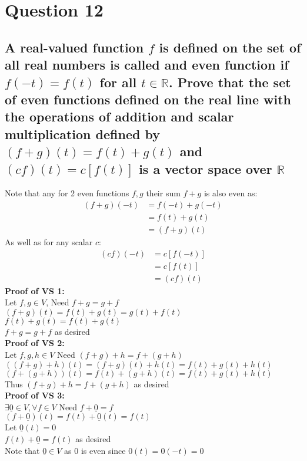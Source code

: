 \documentclass{article}
\begin{document}
\section*{Question 12}
\subsection*{A real-valued function $f$ is defined on the set of all real numbers is called and even function if $f(-t) = f(t)$ for all $t \in \mathds{R}$. Prove that the set of even functions defined on the real line with the operations of addition and scalar multiplication defined by $(f+g)(t) = f(t) + g(t)$ and $(cf)(t) = c[f(t)]$ is a vector space over $\mathds{R}$}
Note that any for 2 even functions $f,g$ their sum $f+g$ is also even as:
\begin{align*}
    (f+g)(-t) &= f(-t) + g(-t)\\
    &= f(t) + g(t)\\
    &= (f+g)(t)
\end{align*}
As well as for any scalar $c$:
\begin{align*}
    (cf)(-t) &= c[f(-t)]\\
    &= c[f(t)]\\
    &= (cf)(t)
\end{align*}
\textbf{Proof of VS 1:}\\
Let $f,g \in V$, Need $f+g = g+f$\\
$(f+g)(t) = f(t) + g(t) = g(t) + f(t)$\\
$f(t) + g(t) = f(t) + g(t)$\\
$f+g = g+f$ as desired\\
\textbf{Proof of VS 2:}\\
Let $f,g,h \in V$ Need $(f+g)+h = f+(g+h)$\\
$((f+g)+h)(t) = (f+g)(t) + h(t) = f(t) + g(t) + h(t)$\\
$(f+(g+h))(t) = f(t) + (g+h)(t) = f(t) + g(t) + h(t)$\\
Thus $(f+g)+h = f+(g+h)$ as desired\\
\textbf{Proof of VS 3:}\\
$\exists \underline{0} \in V, \forall f \in V$ Need $f + \underline{0} = f$\\
$(f+\underline{0})(t) = f(t) + \underline{0}(t) = f(t)$\\
Let $\underline{0}(t) = 0$\\
$f(t) + \underline{0} = f(t)$ as desired \\
Note that $\underline{0} \in V$ as $0$ is even since $0(t) = 0(-t) = 0$\\
\end{document}
